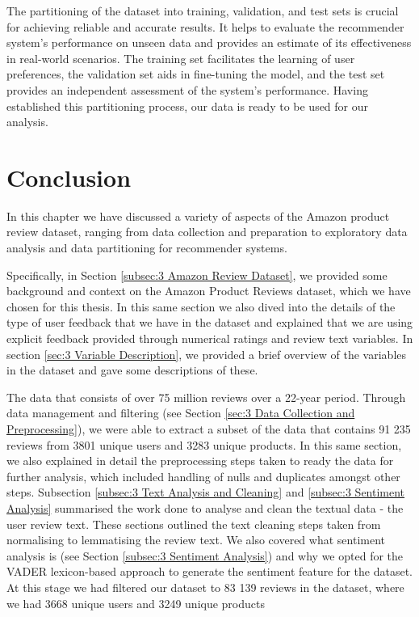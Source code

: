   The partitioning of the dataset into training, validation, and test sets is crucial for achieving reliable and accurate results. It helps to evaluate the recommender system's performance on unseen data and provides an estimate of its effectiveness in real-world scenarios. The training set facilitates the learning of user preferences, the validation set aids in fine-tuning the model, and the test set provides an independent assessment of the system's performance. Having established this partitioning process, our data is ready to be used for our analysis. 




\section{Conclusion}
\label{sec:3 Conclusion}

In this chapter we have discussed a variety of aspects of the Amazon product review dataset, ranging from data collection and preparation to exploratory data analysis and data partitioning for recommender systems. 

Specifically, in Section \ref{subsec:3 Amazon Review Dataset}, we provided some background and context on the Amazon Product Reviews dataset, which we have chosen for this thesis. In this same section we also dived into the details of the type of user feedback that we have in the dataset and explained that we are using explicit feedback provided through numerical ratings and review text variables. In section \ref{sec:3 Variable Description}, we provided a brief overview of the variables in the dataset and gave some descriptions of these. 

The data that consists of over 75 million reviews over a 22-year period. Through data management and filtering (see Section \ref{sec:3 Data Collection and Preprocessing}), we were able to extract a subset of the data that contains 91 235 reviews from 3801 unique users and 3283 unique products. In this same section, we also explained in detail the preprocessing steps taken to ready the data for further analysis, which included handling of nulls and duplicates amongst other steps. Subsection \ref{subsec:3 Text Analysis and Cleaning} and \ref{subsec:3 Sentiment Analysis} summarised the work done to analyse and clean the textual data - the user review text. These sections outlined the text cleaning steps taken from normalising  to lemmatising the review text. We also covered what sentiment analysis is (see Section \ref{subsec:3 Sentiment Analysis}) and why we opted for the VADER lexicon-based approach to generate the sentiment feature for the dataset. At this stage we had filtered our dataset to 83 139 reviews in the dataset, where we had 3668 unique users and 3249 unique products 

